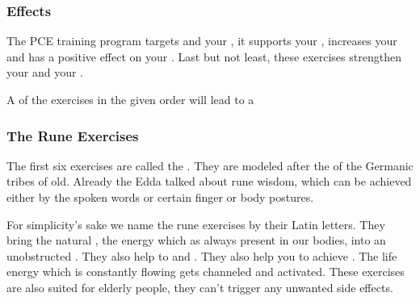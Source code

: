 \begin{frame}
  \frametitle{Effects}

  The PCE training program targets  and your ,
  it supports your ,
  increases your  and has a positive effect on your .
  Last but not least, these exercises strengthen your  and your .

  A  of the exercises in the given order will lead to a 
\end{frame}

\begin{frame}
  \frametitle{The Rune Exercises}

  The first six exercises are called the .
  They are modeled after the  of the Germanic tribes of old.
  Already the Edda talked about rune wisdom, which can be achieved either by the spoken words or certain finger or body postures.


  For simplicity's sake we name the rune exercises by their Latin letters.
  They bring the natural , the energy which as always present in our bodies, into an unobstructed .
  They also help to  and .
  They also help you to achieve .
  The life energy which is constantly flowing gets channeled and activated.
  These exercises are also suited for elderly people, they can't trigger any unwanted side effects.
  

\end{frame}

